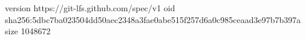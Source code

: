 version https://git-lfs.github.com/spec/v1
oid sha256:5dbc7ba023504dd50aec2348a3fae0abe515f257d6a0c985ceaad3e97b7b397a
size 1048672
